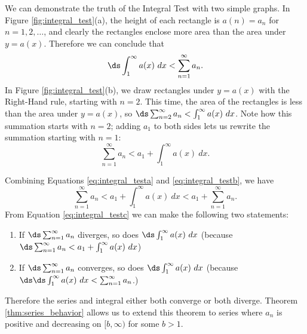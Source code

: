 We can demonstrate the truth of the Integral Test with two simple graphs. In Figure \ref{fig:integral_test}(a), the height of each rectangle is $a(n)=a_n$ for $n=1,2,\ldots$, and clearly the rectangles enclose more area than the area under $y=a(x)$. Therefore we can conclude that \
\begin{equation}
\ds \int_1^\infty a(x)\ dx < \sum_{n=1}^\infty a_n.
\label{eq:integral_testa}
\end{equation}
In Figure \ref{fig:integral_test}(b), we draw rectangles under $y=a(x)$ with the Right-Hand rule, starting with $n=2$. This time, the area of the rectangles is less than the area under $y=a(x)$, so $\ds\sum_{n=2}^\infty a_n < \int_1^\infty a(x)\ dx$. Note how this summation starts with $n=2$; adding $a_1$ to both sides lets us rewrite the summation starting with $n=1$:
\begin{equation}\sum_{n=1}^\infty a_n < a_1 +\int_1^\infty a(x)\ dx.\label{eq:integral_testb}
\end{equation} 


Combining Equations \eqref{eq:integral_testa} and \eqref{eq:integral_testb}, we have
\begin{equation}\sum_{n=1}^\infty a_n< a_1 +\int_1^\infty a(x)\ dx < a_1 + \sum_{n=1}^\infty a_n.\label{eq:integral_testc}\end{equation}
From Equation \eqref{eq:integral_testc} we can make the following two statements:
\begin{enumerate}
	\item If $\ds \sum_{n=1}^\infty a_n$ diverges, so does $\ds\int_1^\infty a(x)\ dx$ \quad (because $\ds \sum_{n=1}^\infty a_n < a_1 +\int_1^\infty a(x)\ dx$)
	\item	If $\ds \sum_{n=1}^\infty a_n$ converges, so does $\ds\int_1^\infty a(x)\ dx$ \quad (because $\ds \ds \int_1^\infty a(x)\ dx < \sum_{n=1}^\infty a_n$.)
\end{enumerate}
Therefore the series and integral either both converge or both diverge. Theorem \ref{thm:series_behavior} allows us to extend this theorem to series where $a_n$ is positive and decreasing on $[b,\infty)$ for some $b>1$.\\

